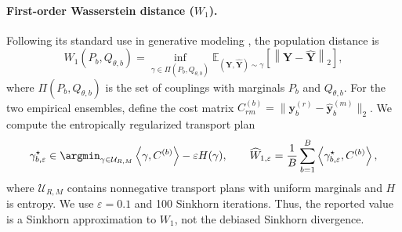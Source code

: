 \paragraph{First-order Wasserstein distance ($W_1$).}
Following its standard use in generative modeling
\citep{arjovsky2017wasserstein}, the population distance is
\begin{equation}
  W_1(P_b,Q_{\theta,b})
  =
  \inf_{\gamma\in\Pi(P_b,Q_{\theta,b})}
  \mathbb{E}_{(\mathbf Y,\widehat{\mathbf Y})\sim\gamma}
  \left[\left\|\mathbf Y-\widehat{\mathbf Y}\right\|_2\right],
  \label{eq:wasserstein-one}
\end{equation}
where $\Pi(P_b,Q_{\theta,b})$ is the set of couplings with marginals $P_b$
and $Q_{\theta,b}$.  For the two empirical ensembles, define the cost matrix
$C^{(b)}_{rm}=\|\mathbf y_b^{(r)}-\widehat{\mathbf y}_b^{(m)}\|_2$.
We compute the entropically regularized transport plan
\citep{cuturi2013sinkhorn}
\begin{equation}
  \gamma_{b,\varepsilon}^{\star}
  \in
  \argmin_{\gamma\in\mathcal{U}_{R,M}}
  \left\langle\gamma,C^{(b)}\right\rangle
  -\varepsilon H(\gamma),
  \qquad
  \widehat W_{1,\varepsilon}
  =
  \frac{1}{B}\sum_{b=1}^{B}
  \left\langle\gamma_{b,\varepsilon}^{\star},C^{(b)}\right\rangle,
  \label{eq:sinkhorn-wasserstein}
\end{equation}
where $\mathcal{U}_{R,M}$ contains nonnegative transport plans with uniform
marginals and $H$ is entropy.  We use $\varepsilon=0.1$ and 100 Sinkhorn
iterations.  Thus, the reported value is a Sinkhorn approximation to $W_1$,
not the debiased Sinkhorn divergence.

